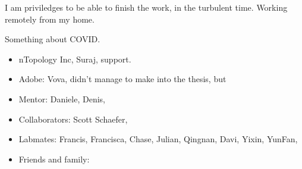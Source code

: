 I am priviledges to be able to finish the work, in the turbulent time.
Working remotely from my home.

Something about COVID.

\begin{itemize}
  \item nTopology Inc, Suraj, support.
  \item Adobe: Vova, didn't manage to make into the thesis, but 
  \item Mentor: Daniele, Denis, 
  \item Collaborators: Scott Schaefer, 
  \item Labmates: Francis, Francisca, Chase, Julian, Qingnan, Davi, Yixin, YunFan, 
  \item Friends and family: 
\end{itemize}

